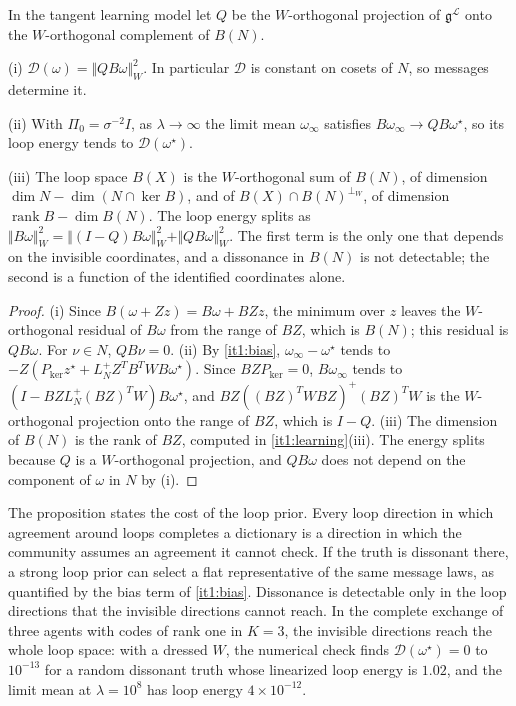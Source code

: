 \documentclass[11pt,letterpaper]{report}
\begin{document}
In the tangent learning model let $Q$ be the $W$-orthogonal projection of $\mathfrak g^{\mathcal L}$ onto the $W$-orthogonal complement of $B(N)$.

\textup{(i)} $\mathcal D(\omega)=\Vert QB\omega\Vert_W^2$. In particular $\mathcal D$ is constant on cosets of $N$, so messages determine it.

\textup{(ii)} With $\Pi_0=\sigma^{-2}I$, as $\lambda\to\infty$ the limit mean $\omega_\infty$ satisfies $B\omega_\infty\to QB\omega^\star$, so its loop energy tends to $\mathcal D(\omega^\star)$.

\textup{(iii)} The loop space $B(X)$ is the $W$-orthogonal sum of $B(N)$, of dimension $\dim N-\dim(N\cap\ker B)$, and of $B(X)\cap B(N)^{\perp_W}$, of dimension $\operatorname{rank}B-\dim B(N)$. The loop energy splits as $\Vert B\omega\Vert_W^2=\Vert(I-Q)B\omega\Vert_W^2+\Vert QB\omega\Vert_W^2$. The first term is the only one that depends on the invisible coordinates, and a dissonance in $B(N)$ is not detectable; the second is a function of the identified coordinates alone.
\begin{proof}
(i) Since $B(\omega+Zz)=B\omega+BZz$, the minimum over $z$ leaves the $W$-orthogonal residual of $B\omega$ from the range of $BZ$, which is $B(N)$; this residual is $QB\omega$. For $\nu\in N$, $QB\nu=0$. (ii) By \cref{it1:bias}, $\omega_\infty-\omega^\star$ tends to $-Z(P_{\ker}z^\star+L_N^+Z^TB^TWB\omega^\star)$. Since $BZP_{\ker}=0$, $B\omega_\infty$ tends to $(I-BZL_N^+(BZ)^TW)B\omega^\star$, and $BZ((BZ)^TWBZ)^+(BZ)^TW$ is the $W$-orthogonal projection onto the range of $BZ$, which is $I-Q$. (iii) The dimension of $B(N)$ is the rank of $BZ$, computed in \cref{it1:learning}(iii). The energy splits because $Q$ is a $W$-orthogonal projection, and $QB\omega$ does not depend on the component of $\omega$ in $N$ by (i).
\end{proof}

The proposition states the cost of the loop prior. Every loop direction in which agreement around loops completes a dictionary is a direction in which the community assumes an agreement it cannot check. If the truth is dissonant there, a strong loop prior can select a flat representative of the same message laws, as quantified by the bias term of \cref{it1:bias}. Dissonance is detectable only in the loop directions that the invisible directions cannot reach. In the complete exchange of three agents with codes of rank one in $K=3$, the invisible directions reach the whole loop space: with a dressed $W$, the numerical check finds $\mathcal D(\omega^\star)=0$ to $10^{-13}$ for a random dissonant truth whose linearized loop energy is $1.02$, and the limit mean at $\lambda=10^8$ has loop energy $4\times10^{-12}$.
\end{document}
